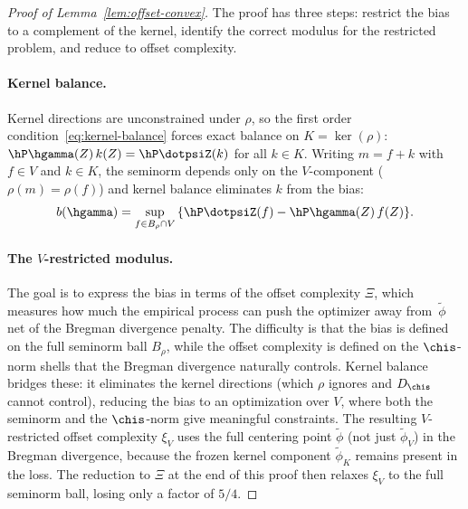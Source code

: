 \documentclass{article}
\begin{document}
\begin{proof}[Proof of Lemma~\ref{lem:offset-convex}]
The proof has three steps:
restrict the bias to a complement
of the kernel,
identify the correct modulus
for the restricted problem,
and reduce to offset complexity.

\paragraph{Kernel balance.}
Kernel directions are unconstrained under $\rho$,
so the first order condition~\eqref{eq:kernel-balance}
forces exact balance on $K = \ker(\rho)$:
$\hP\hgamma(Z)\,k(Z) = \hP\dotpsiZ(k)$
for all $k \in K$.
Writing $m = f + k$ with $f \in V$
and $k \in K$,
the seminorm depends only
on the $V$-component
($\rho(m) = \rho(f)$)
and kernel balance eliminates $k$
from the bias:
\[
b(\hgamma)
  = \sup_{f \in B_\rho \cap V}
    \qty{\hP\dotpsiZ(f) - \hP\hgamma(Z)\,f(Z)}.
\]

\paragraph{The $V$-restricted modulus.}
The goal is to express the bias
in terms of the offset complexity $\Xi$,
which measures how much the empirical process
can push the optimizer away from~$\tilde\phi$
net of the Bregman divergence penalty.
The difficulty is that the bias is defined
on the full seminorm ball $B_\rho$,
while the offset complexity is defined
on the $\chis$-norm shells
that the Bregman divergence naturally controls.
Kernel balance bridges these:
it eliminates the kernel directions
(which $\rho$ ignores and $D_{\chis}$ cannot control),
reducing the bias to an optimization over $V$,
where both the seminorm and the $\chis$-norm
give meaningful constraints.
The resulting $V$-restricted offset complexity $\xi_V$
uses the full centering point $\tilde\phi$
(not just $\tilde\phi_V$)
in the Bregman divergence,
because the frozen kernel component $\tilde\phi_K$
remains present in the loss.
The reduction to $\Xi$ at the end of this proof
then relaxes $\xi_V$ to the full seminorm ball,
losing only a factor of $5/4$.


\end{proof}
\end{document}
